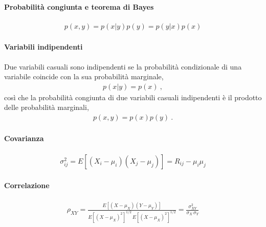 \documentclass[letterpaper,10pt,italian]{jupyterBook}
\begin{document}
\paragraph{Probabilità congiunta e teorema di Bayes}
\label{\detokenize{ch/statistics/random_variables:probabilita-congiunta-e-teorema-di-bayes}}\begin{equation*}
\begin{split}p(x,y) = p(x|y)p(y) = p(y|x)p(x)\end{split}
\end{equation*}

\paragraph{Variabili indipendenti}
\label{\detokenize{ch/statistics/random_variables:variabili-indipendenti}}
\sphinxAtStartPar
Due variabili casuali sono indipendenti se la probabilità condizionale di una variabile coincide con la sua probabilità marginale,
\begin{equation*}
\begin{split}p(x|y) = p(x) \ ,\end{split}
\end{equation*}
\sphinxAtStartPar
così che la probabilità congiunta di due variabili casuali indipendenti è il prodotto delle probabilità marginali,
\begin{equation*}
\begin{split}p(x,y) = p(x)p(y) \ .\end{split}
\end{equation*}

\paragraph{Covarianza}
\label{\detokenize{ch/statistics/random_variables:covarianza}}\begin{equation*}
\begin{split}\sigma^2_{ij} = E[(X_i-\mu_i)(X_j-\mu_j)] = R_{ij} - \mu_i \mu_j\end{split}
\end{equation*}

\paragraph{Correlazione}
\label{\detokenize{ch/statistics/random_variables:correlazione}}\begin{equation*}
\begin{split}\rho_{XY} = \frac{E[(X-\mu_X)(Y-\mu_Y)]}{E[(X-\mu_X)^2]^{1/2} \, E[(X-\mu_X)^2]^{1/2}} = \frac{\sigma_{XY}^2}{\sigma_X \, \sigma_Y}\end{split}
\end{equation*}
\end{document}
